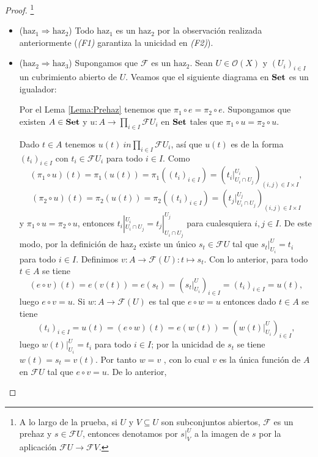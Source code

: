 \documentclass[letterpaper]{article} %
\newcommand{\Set}{\normalfont{\textbf{Set}}}
\begin{document}
   \begin{proof}\footnote{A lo largo de la prueba, si $U$ y $V\subseteq U$ son subconjuntos abiertos, $\mathscr{F}$ es un prehaz y $s\in \mathscr{F}U$, entonces denotamos por $\left.s\right|^U_{V}$ a la imagen de $s$ por la aplicación $\mathscr{F}U\to\mathscr{F}V$.}
      \begin{itemize}
         \item[$\bullet$](${\text{haz}}_1\Rightarrow {\text{haz}}_2$) Todo ${\text{haz}}_1$ es un ${\text{haz}}_2$ por la observación realizada anteriormente (\textit{(F1)} garantiza la unicidad en \textit{(F2)}).
         \item[$\bullet$](${\text{haz}}_2\Rightarrow {\text{haz}}_3$) Supongamos que $\mathscr{F}$ es un ${\text{haz}}_2$. Sean $U\in \mathcal{O}(X)$ y $\left(U_i\right)_{i\in I}$ un cubrimiento abierto de $U$. Veamos que el siguiente diagrama en $\Set$ es un igualador:
            
            Por el Lema \ref{Lema:Prehaz} tenemos que $\pi_1\circ e=\pi_2\circ e$. Supongamos que existen $A\in \Set$ y $u:A\to \prod_{i\in I}\mathscr{F}U_i$ en $\Set$ tales que $\pi_1\circ u=\pi_2\circ u$.
            
            Dado $t\in A$ tenemos $u(t)\ in \prod_{i\in I}\mathscr{F}U_i$, así que $u(t)$ es de la forma $(t_i)_{i\in I}$ con $t_i \in \mathscr{F}U_i$ para todo $i\in I$. Como
            $$
            (\pi_1\circ u)(t)=\pi_1(u(t))=\pi_1\left( \left( t_i\right)_{i\in I}\right)=\left( t_i|^{U_i}_{U_i\cap U_j}\right)_{(i,j)\in I\times I},
            $$
            $$  
               (\pi_2\circ u)(t)=\pi_2(u(t))=\pi_2\left( \left( t_i\right)_{i\in I}\right)=\left( t_j|^{U_j}_{U_i\cap U_j}\right)_{(i,j)\in I\times I}
            $$
            y $\pi_1\circ u=\pi_2\circ u$, entonces $t_i|^{U_i}_{U_i\cap U_j} = t_j|^{U_j}_{U_i\cap U_j}$ para cualesquiera $i,j\in I$. De este modo, por la definición de ${\text{haz}}_2$ existe un único $s_t\in \mathscr{F}U$ tal que $\left. s_t\right|^U_{U_i}=t_i$ para todo $i\in I$. Definimos $v:A\to \mathscr{F}(U):t\mapsto s_t$. Con lo anterior, para todo $t\in A$ se tiene
            $$
               (e\circ v)(t)=e(v(t))=e(s_t)=\left( \left. s_t\right|^U_{U_i}\right)_{i\in I}=\left( t_i\right)_{i\in I}=u(t),
            $$
            luego $e\circ v=u$. Si $w:A\to \mathscr{F}(U)$ es tal que $e\circ w=u$ entonces dado $t\in A$ se tiene
            $$
               \left( t_i\right)_{i\in I}=u(t)=(e\circ w)(t)=e(w(t))=\left( \left.w(t)\right|^U_{U_i}\right)_{i\in I},
            $$
            luego $\left.w(t)\right|^U_{U_i}=t_i$ para todo $i\in I$; por la unicidad de $s_t$ se tiene $w(t)=s_t=v(t)$. Por tanto $w=v$ , con lo cual $v$ es la única función de $A$ en $\mathscr{F}U$ tal que $e\circ v=u$. De lo anterior,

\end{itemize}
\end{proof}
\end{document}
